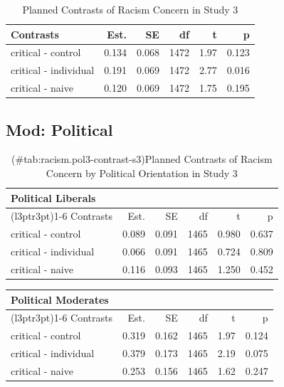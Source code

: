 \documentclass[
]{book}
\begin{document}
\begin{table}

\caption{\label{tab:racism-contrast-s3}Planned Contrasts of Racism Concern in Study 3}
\centering
\fontsize{13}{15}\selectfont
\begin{tabular}[t]{lrrrrr}
\toprule
Contrasts & Est. & SE & df & t & p\\
\midrule
critical - control & 0.134 & 0.068 & 1472 & 1.97 & 0.123\\
critical - individual & 0.191 & 0.069 & 1472 & 2.77 & 0.016\\
critical - naive & 0.120 & 0.069 & 1472 & 1.75 & 0.195\\
\bottomrule
\end{tabular}
\end{table}

\hypertarget{mod-political-18}{%
\subsection{Mod: Political}\label{mod-political-18}}

\begin{table}

\caption{(\#tab:racism.pol3-contrast-s3)Planned Contrasts of Racism Concern by Political Orientation in Study 3}
\centering
\fontsize{13}{15}\selectfont
\begin{tabular}[t]{lrrrrr}
\toprule
\multicolumn{6}{l}{Political Liberals} \\
\cmidrule(l{3pt}r{3pt}){1-6}
Contrasts & Est. & SE & df & t & p\\
\midrule
critical - control & 0.089 & 0.091 & 1465 & 0.980 & 0.637\\
critical - individual & 0.066 & 0.091 & 1465 & 0.724 & 0.809\\
critical - naive & 0.116 & 0.093 & 1465 & 1.250 & 0.452\\
\bottomrule
\end{tabular}
\end{table}

\begin{table}
\centering
\begin{tabular}{lrrrrr}
\toprule
\multicolumn{6}{l}{Political Moderates} \\
\cmidrule(l{3pt}r{3pt}){1-6}
Contrasts & Est. & SE & df & t & p\\
\midrule
critical - control & 0.319 & 0.162 & 1465 & 1.97 & 0.124\\
critical - individual & 0.379 & 0.173 & 1465 & 2.19 & 0.075\\
critical - naive & 0.253 & 0.156 & 1465 & 1.62 & 0.247\\
\bottomrule
\end{tabular}
\end{table}
\end{document}
